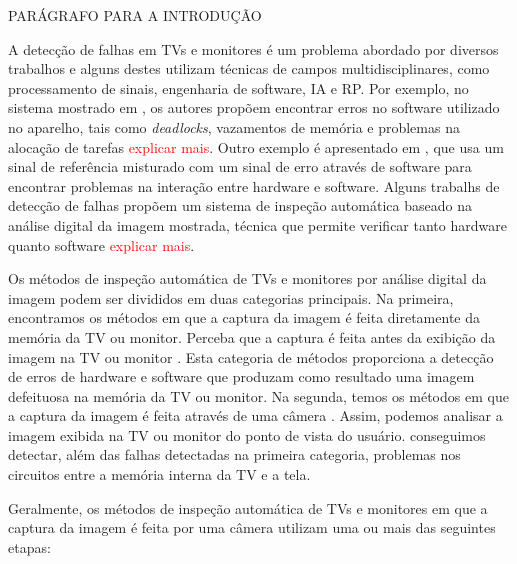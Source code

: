 PARÁGRAFO PARA A INTRODUÇÃO

A detecção de falhas em TVs e monitores é um problema abordado por diversos trabalhos e alguns destes utilizam técnicas de campos multidisciplinares, como processamento de sinais, engenharia de software, IA e RP. Por exemplo, no sistema mostrado em \cite{inspectsoftware}, os autores propõem encontrar erros no software utilizado no aparelho, tais como \textit{deadlocks}, vazamentos de memória e problemas na alocação de tarefas \textcolor{red}{explicar mais}. Outro exemplo é apresentado em \cite{inspecthardsoft}, que usa um sinal de referência misturado com um sinal de erro através de software para encontrar problemas na interação entre hardware e software. Alguns trabalhs de detecção de falhas propõem um sistema de inspeção automática baseado na análise digital da imagem mostrada, técnica que permite verificar tanto hardware quanto software \cite{inspect,inspectimage00,inspectimage01,inspectimage02,inspectgrabber} \textcolor{red}{explicar mais}.

Os métodos de inspeção automática de TVs e monitores por análise digital da imagem podem ser divididos em duas categorias principais. Na primeira, encontramos os métodos em que a captura da imagem é feita diretamente da memória da TV ou monitor. Perceba que a captura é feita antes da exibição da imagem na TV ou monitor \cite{inspectimage00,inspectimage03,inspectimage04}. Esta categoria de métodos proporciona a detecção de erros de hardware e software que produzam como resultado uma imagem defeituosa na memória da TV ou monitor. Na segunda, temos os métodos em que a captura da imagem é feita através de uma câmera \cite{inspect,vantagemauto}. Assim, podemos analisar a imagem exibida na TV ou monitor do ponto de vista do usuário.
 conseguimos detectar, além das falhas detectadas na primeira categoria, problemas nos circuitos entre a memória interna da TV e a tela.

Geralmente, os métodos de inspeção automática de TVs e monitores em que a captura da imagem é feita por uma câmera utilizam uma ou mais das seguintes etapas:

